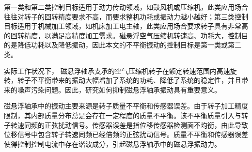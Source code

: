 第一类和第二类控制目标适用于动力传动领域，如鼓风机或压缩机，此类应用场合往往对转子的回转精度要求不高，而要求整机功耗或振动力越小越好；第三类控制目标适用于机械加工领域，如机床加工电主轴，此类应用场合要求转子具有非常高的回转精度，以满足高精度加工需求。磁悬浮空气压缩机转速高、功耗大，控制目的是降低功耗以及降低振动，因此本文的不平衡振动的控制目标是第一类或第二类。

实际工作状况下， 磁悬浮轴承支承的空气压缩机转子在额定转速范围内高速旋转，转子不平衡带来的振动大幅增加了系统的功耗、降低了系统的稳定性，并且带来的噪声污染问题。因此，研究如何抑制磁悬浮轴承振动具有重要意义。

磁悬浮轴承中的振动主要来源是转子质量不平衡和传感器误差。由于转子加工精度限制，其内部质量分布总是会存在一定程度的质量不平衡。该不平衡质量引入与转子转速同频的正弦扰动信号。传感器误差是指位移传感器检测面不均衡，由此导致位移信号中包含转子转速同频已经倍频的正弦扰动信号。质量不平衡和传感器误差使得控制控制电流中存在谐波成分，引起磁悬浮轴承中的磁悬浮振动力。

